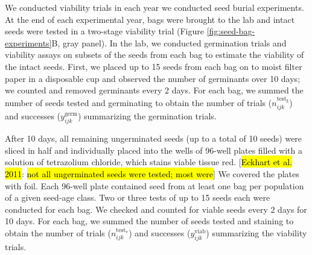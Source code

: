 \documentclass[12pt, oneside, titlepage]{article}   	%
\begin{document}
We conducted viability trials in each year we conducted seed burial experiments. At the end of each experimental year, bags were brought to the lab and intact seeds were tested in a two-stage viability trial (Figure \ref{fig:seed-bag-experiments}B, gray panel). In the lab, we conducted germination trials and viability assays on subsets of the seeds from each bag to estimate the viability of the intact seeds. First, we placed up to 15 seeds from each bag on to moist filter paper in a disposable cup and observed the number of germinants over 10 days; we counted and removed germinants every 2 days. For each bag, we summed the number of seeds tested and germinating to obtain the number of trials ($n^\mathrm{test_g}_{ijk}$) and successes ($y^{\mathrm{germ}}_{ijk}$) summarizing the germination trials. 

After 10 days, all remaining ungerminated seeds (up to a total of 10 seeds) were sliced in half and individually placed into the wells of 96-well plates filled with a solution of tetrazolium chloride, which stains viable tissue red. [\hl{Eckhart et al. 2011}: \hl{not all ungerminated seeds were tested; most were}] We covered the plates with foil. Each 96-well plate contained seed from at least one bag per population of a given seed-age class. Two or three tests of up to 15 seeds each were conducted for each bag. We checked and counted for viable seeds  every 2 days for 10 days.  For each bag, we summed the number of seeds tested and staining to obtain the number of trials ($n^\mathrm{test_v}_{ijk}$) and successes ($y^{\mathrm{viab}}_{ijk}$) summarizing the viability trials. 
\end{document}
